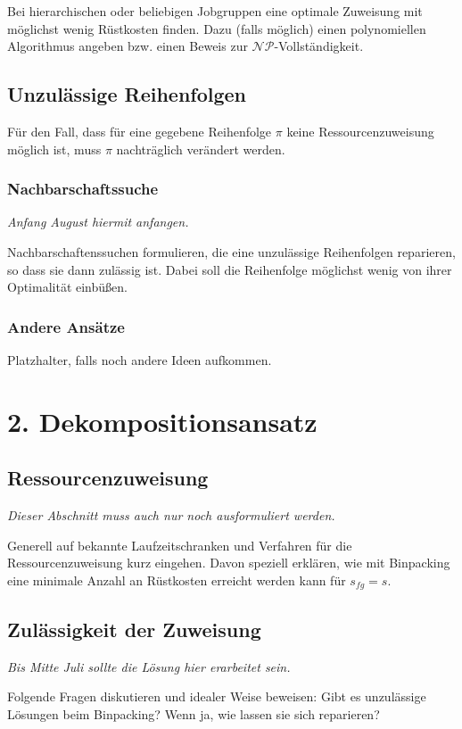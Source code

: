 \documentclass{scrreprt}
\begin{document}
Bei hierarchischen oder beliebigen Jobgruppen eine optimale Zuweisung mit möglichst wenig Rüstkosten finden.
Dazu (falls möglich) einen polynomiellen Algorithmus angeben bzw. einen Beweis zur $\mathcal{NP}$-Vollständigkeit.

\section{Unzulässige Reihenfolgen}
\label{UnzulaessigeReihenfolgen}
Für den Fall, dass für eine gegebene Reihenfolge $\pi$ keine Ressourcenzuweisung möglich ist, muss $\pi$ nachträglich verändert werden.
\subsection{Nachbarschaftssuche}
\textit{Anfang August hiermit anfangen.}

Nachbarschaftenssuchen formulieren, die eine unzulässige Reihenfolgen reparieren, so dass sie dann zulässig ist.
Dabei soll die Reihenfolge möglichst wenig von ihrer Optimalität einbüßen.

\subsection{Andere Ansätze}
Platzhalter, falls noch andere Ideen aufkommen.






\chapter{2. Dekompositionsansatz}
\section{Ressourcenzuweisung}
\textit{Dieser Abschnitt muss auch nur noch ausformuliert werden.}

Generell auf bekannte Laufzeitschranken und Verfahren für die Ressourcenzuweisung kurz eingehen.
Davon speziell erklären, wie mit Binpacking eine minimale Anzahl an Rüstkosten erreicht werden kann für $s_{fg}=s$.


\section{Zulässigkeit der Zuweisung}
\textit{Bis Mitte Juli sollte die Lösung hier erarbeitet sein.}

Folgende Fragen diskutieren und idealer Weise beweisen:
Gibt es unzulässige Lösungen beim Binpacking? Wenn ja, wie lassen sie sich reparieren?
\end{document}
